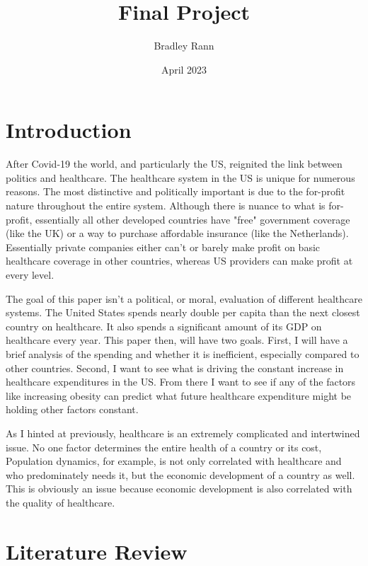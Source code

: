 \documentclass{article}
\title{Final Project}
\author{Bradley Rann }
\date{April 2023}
\begin{document}
\maketitle

\section{Introduction}

After Covid-19 the world, and particularly the US, reignited the link between politics and healthcare. The healthcare system in the US is unique for numerous reasons. The most distinctive and politically important is due to the for-profit nature throughout the entire system. Although there is nuance to what is for-profit, essentially all other developed countries have "free" government coverage (like the UK) or a way to purchase affordable insurance (like the Netherlands). Essentially private companies either can't or barely make profit on basic healthcare coverage in other countries, whereas US providers can make profit at every level.

The goal of this paper isn't a political, or moral, evaluation of different healthcare systems. The United States spends nearly double per capita than the next closest country on healthcare. It also spends a significant amount of its GDP on healthcare every year. This paper then, will have two goals. First, I will have a brief analysis of the spending and whether it is inefficient, especially compared to other countries. Second, I want to see what is driving the constant increase in healthcare expenditures in the US. From there I want to see if any of the factors like increasing obesity can predict what future healthcare expenditure might be holding other factors constant.

As I hinted at previously, healthcare is an extremely complicated and intertwined issue. No one factor determines the entire health of a country or its cost, Population dynamics, for example, is not only correlated with healthcare and who predominately needs it, but the economic development of a country as well. This is obviously an issue because economic development is also correlated with the quality of healthcare. 


\section{Literature Review}
\end{document}
